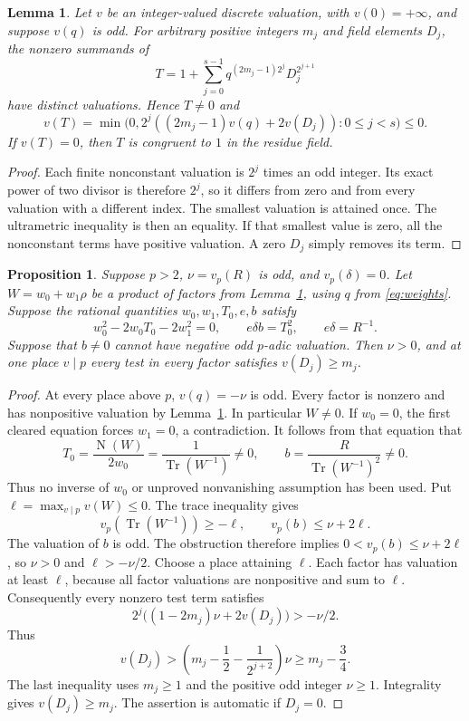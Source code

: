 \documentclass[11pt,a4paper]{article}
\newtheorem{lemma}[theorem]{Lemma}
\newtheorem{proposition}[theorem]{Proposition}
\theoremstyle{remark}\newtheorem{remark}[theorem]{Remark}
\DeclareMathOperator{\Tr}{Tr}\DeclareMathOperator{\Nm}{N}
\begin{document}
\begin{lemma}\label{lem:min}
Let $v$ be an integer-valued discrete valuation, with $v(0)=+\infty$,
and suppose $v(q)$ is odd. For arbitrary positive integers $m_j$ and
field elements $D_j$, the nonzero summands of
\[
 T=1+\sum_{j=0}^{s-1}q^{(2m_j-1)2^j}D_j^{2^{j+1}}
\]
have distinct valuations. Hence $T\ne0$ and
\[
 v(T)=\min\bigl(0,2^j((2m_j-1)v(q)+2v(D_j)):0\le j<s\bigr)\le0.
\]
If $v(T)=0$, then $T$ is congruent to $1$ in the residue field.
\end{lemma}
\begin{proof}
Each finite nonconstant valuation is $2^j$ times an odd integer. Its
exact power of two divisor is therefore $2^j$, so it differs from zero
and from every valuation with a different index. The smallest valuation
is attained once. The ultrametric inequality is then an equality. If
that smallest value is zero, all the nonconstant terms have positive
valuation. A zero $D_j$ simply removes its term.
\end{proof}

\begin{proposition}\label{prop:extract}
Suppose $p>2$, $\nu=v_p(R)$ is odd, and $v_p(\delta)=0$.
Let $W=w_0+w_1\rho$ be a product of factors from Lemma~\ref{lem:min},
using $q$ from \eqref{eq:weights}. Suppose the rational quantities
$w_0,w_1,T_0,e,b$ satisfy
\begin{equation}\label{eq:trace}
 w_0^2-2w_0T_0-2w_1^2=0,\qquad e\delta b=T_0^2,
 \qquad e\delta=R^{-1}.
\end{equation}
Suppose that $b\ne0$ cannot have negative odd $p$-adic valuation.
Then $\nu>0$, and at one place $v\mid p$ every test in every factor
satisfies $v(D_j)\ge m_j$.
\end{proposition}
\begin{proof}
At every place above $p$, $v(q)=-\nu$ is odd. Every factor is nonzero
and has nonpositive valuation by Lemma~\ref{lem:min}. In particular
$W\ne0$. If $w_0=0$, the first cleared equation forces $w_1=0$,
a contradiction. It follows from that equation that
\[
 T_0=\frac{\Nm(W)}{2w_0}=\frac1{\Tr(W^{-1})}\ne0,
 \qquad b=\frac{R}{\Tr(W^{-1})^2}\ne0.
\]
Thus no inverse of $w_0$ or unproved nonvanishing assumption has been used.
Put $\ell=\max_{v\mid p}v(W)\le0$. The trace inequality gives
\[
 v_p(\Tr(W^{-1}))\ge-\ell,
 \qquad v_p(b)\le\nu+2\ell.
\]
The valuation of $b$ is odd. The obstruction therefore implies
$0<v_p(b)\le\nu+2\ell$, so $\nu>0$ and $\ell>-\nu/2$.
Choose a place attaining $\ell$. Each factor has valuation at least
$\ell$, because all factor valuations are nonpositive and sum to $\ell$.
Consequently every nonzero test term satisfies
\[
 2^j\bigl((1-2m_j)\nu+2v(D_j)\bigr)>-\nu/2.
\]
Thus
\[
 v(D_j)>\left(m_j-\frac12-\frac1{2^{j+2}}\right)\nu
 \ge m_j-\frac34.
\]
The last inequality uses $m_j\ge1$ and the positive odd integer $\nu\ge1$.
Integrality gives $v(D_j)\ge m_j$. The assertion is automatic if $D_j=0$.
\end{proof}
\end{document}
